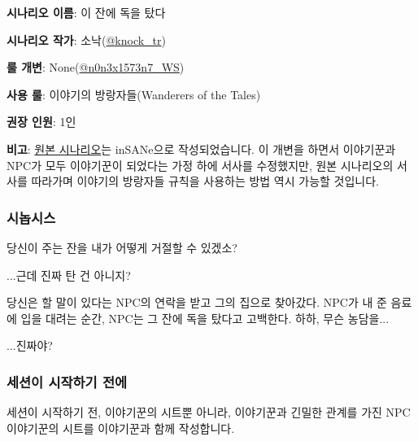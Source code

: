 \documentclass{report}
\begin{document}
	\textbf{시나리오 이름}: 이 잔에 독을 탔다
	
	\textbf{시나리오 작가}: 소낙(\href{https://twitter.com/knock_tr}{@knock\_tr})
	
	\textbf{룰 개변}: None(\href{https://www.twitter.com/n0n3x1573n7_WS}{@n0n3x1573n7\_WS})
	
	\textbf{사용 룰}: 이야기의 방랑자들(Wanderers of the Tales)
	
	\textbf{권장 인원}: 1인
	
	\textbf{비고}: \href{https://fwalker.postype.com/post/3654634}{원본 시나리오}는 inSANe으로 작성되었습니다. 이 개변을 하면서 이야기꾼과 NPC가 모두 이야기꾼이 되었다는 가정 하에 서사를 수정했지만, 원본 시나리오의 서사를 따라가며 이야기의 방랑자들 규칙을 사용하는 방법 역시 가능할 것입니다.
	
	\subsubsection*{시놉시스}
	{\storyfont 당신이 주는 잔을 내가 어떻게 거절할 수 있겠소?}
	
	{\storyfont ...근데 진짜 탄 건 아니지?}
	
	당신은 할 말이 있다는 NPC의 연락을 받고 그의 집으로 찾아갔다. NPC가 내 준 음료에 입을 대려는 순간, NPC는 그 잔에 독을 탔다고 고백한다. 하하, 무슨 농담을...
	
	...진짜야?
	
	\subsubsection*{세션이 시작하기 전에}
		세션이 시작하기 전, 이야기꾼의 시트뿐 아니라, 이야기꾼과 긴밀한 관계를 가진 NPC 이야기꾼의 시트를 이야기꾼과 함께 작성합니다.
\end{document}
